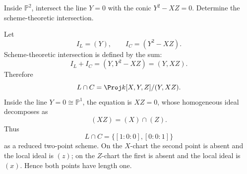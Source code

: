 \begin{problem}\label{prob:vi37-03}
Inside \(\mathbb P^2\), intersect the line \(Y=0\) with the conic \(Y^2-XZ=0\). Determine the scheme-theoretic intersection.
\end{problem}

\ifdefined\FullProblemDossiers
\begin{solution}
Let
\[
I_L=(Y),
\qquad
I_C=(Y^2-XZ).
\]
Scheme-theoretic intersection is defined by the sum:
\[
I_L+I_C
=
(Y,Y^2-XZ)
=
(Y,XZ).
\]
Therefore
\[
L\cap C
=
\Proj k[X,Y,Z]/(Y,XZ).
\]
Inside the line \(Y=0\cong\mathbb P^1\), the equation is \(XZ=0\), whose homogeneous ideal decomposes as
\[
(XZ)=(X)\cap(Z).
\]
Thus
\[
\boxed{
L\cap C
=
\{[1:0:0],[0:0:1]\}
}
\]
as a reduced two-point scheme. On the \(X\)-chart the second point is absent and the local ideal is \((z)\); on the \(Z\)-chart the first is absent and the local ideal is \((x)\). Hence both points have length one.
\end{solution}
\fi
